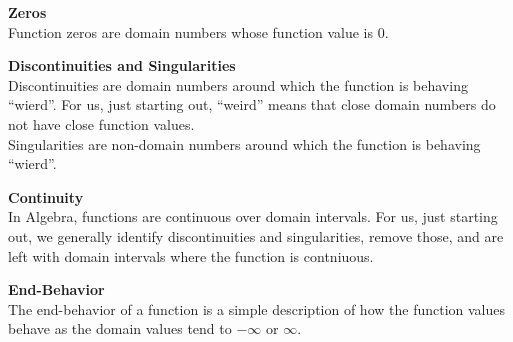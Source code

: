 \documentclass{ximera}
\begin{document}
\begin{definition}
\begin{explanation}  \textbf{\textcolor{blue!75!black}{Zeros}} \\

Function zeros are domain numbers whose function value is $0$.

\end{explanation}












\begin{explanation}  \textbf{\textcolor{blue!75!black}{Discontinuities and Singularities}} \\

Discontinuities are domain numbers around which the function is behaving ``wierd''. For us, just starting out, ``weird'' means that close domain numbers do not have close function values.   \\




Singularities are non-domain numbers around which the function is behaving ``wierd''.   \\


\end{explanation}



\begin{explanation}  \textbf{\textcolor{blue!75!black}{Continuity}} \\

In Algebra, functions are continuous over domain intervals.  For us, just starting out, we generally identify discontinuities and singularities, remove those, and are left with domain intervals where the function is contniuous.

\end{explanation}







\begin{explanation}  \textbf{\textcolor{blue!75!black}{End-Behavior}} \\

The end-behavior of a function is a simple description of how the function values behave as the domain values tend to $-\infty$ or $\infty$.

\end{explanation}










\end{definition}
\end{document}
